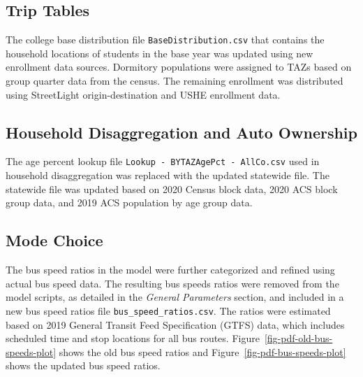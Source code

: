 \documentclass[
  letterpaper,
  DIV=11,
  numbers=noendperiod,
  titlepage=false]{scrreprt}
\begin{document}
\hypertarget{trip-tables}{%
\subsection{Trip Tables}\label{trip-tables}}

The college base distribution file \texttt{BaseDistribution.csv} that
contains the household locations of students in the base year was
updated using new enrollment data sources. Dormitory populations were
assigned to TAZs based on group quarter data from the census. The
remaining enrollment was distributed using StreetLight
origin-destination and USHE enrollment data.

\hypertarget{household-disaggregation-and-auto-ownership}{%
\subsection{Household Disaggregation and Auto
Ownership}\label{household-disaggregation-and-auto-ownership}}

The age percent lookup file
\texttt{Lookup\ -\ BYTAZAgePct\ -\ AllCo.csv} used in household
disaggregation was replaced with the updated statewide file. The
statewide file was updated based on 2020 Census block data, 2020 ACS
block group data, and 2019 ACS population by age group data.

\hypertarget{mode-choice}{%
\subsection{Mode Choice}\label{mode-choice}}

The bus speed ratios in the model were further categorized and refined
using actual bus speed data. The resulting bus speeds ratios were
removed from the model scripts, as detailed in the \emph{General
Parameters} section, and included in a new bus speed ratios file
\texttt{bus\_speed\_ratios.csv}. The ratios were estimated based on 2019
General Transit Feed Specification (GTFS) data, which includes scheduled
time and stop locations for all bus routes.
Figure~\ref{fig-pdf-old-bus-speeds-plot} shows the old bus speed ratios
and Figure~\ref{fig-pdf-bus-speeds-plot} shows the updated bus speed
ratios.
\end{document}
